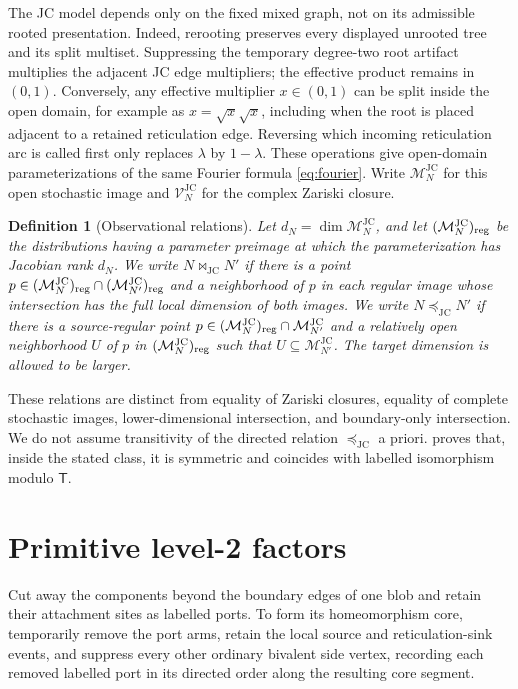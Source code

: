 \documentclass[11pt]{article}
\newtheorem{definition}[theorem]{Definition}
\theoremstyle{remark}
\newcommand{\M}{\mathcal M}
\newcommand{\V}{\mathcal V}
\newcommand{\JC}{\mathrm{JC}}
\newcommand{\Tmove}{\mathsf T}
\newcommand{\preceqjc}{\preceq_{\!\JC}}
\newcommand{\bowtiejc}{\mathbin{\bowtie}_{\!\JC}}
\begin{document}
The JC model depends only on the fixed mixed graph, not on its admissible
rooted presentation.  Indeed, rerooting preserves every displayed unrooted
tree and its split multiset.  Suppressing the temporary degree-two root
artifact multiplies the adjacent JC edge multipliers; the effective product
remains in $(0,1)$.  Conversely, any effective multiplier $x\in(0,1)$ can be
split inside the open domain, for example as $x=\sqrt{x}\sqrt{x}$, including
when the root is placed adjacent to a retained reticulation edge.  Reversing
which incoming reticulation arc is called first only replaces $\lambda$ by
$1-\lambda$.  These operations give open-domain parameterizations of the
same Fourier formula \eqref{eq:fourier}.  Write $\M_N^{\JC}$ for this open
stochastic image and $\V_N^{\JC}$ for the complex Zariski closure.

\begin{definition}[Observational relations]\label{def:relations}
Let $d_N=\dim\M_N^{\JC}$, and let $(\M_N^{\JC})_{\rm reg}$ be the
distributions having a parameter preimage at which the parameterization has
Jacobian rank $d_N$.  We write $N\bowtiejc N'$ if there is a point
$p\in(\M_N^{\JC})_{\rm reg}\cap(\M_{N'}^{\JC})_{\rm reg}$ and a neighborhood
of $p$ in each regular image whose intersection has the full local dimension
of both images.  We write $N\preceqjc N'$ if there is a source-regular point
$p\in(\M_N^{\JC})_{\rm reg}\cap\M_{N'}^{\JC}$ and a relatively open
neighborhood $U$ of $p$ in $(\M_N^{\JC})_{\rm reg}$ such that
$U\subseteq\M_{N'}^{\JC}$.  The target dimension is allowed to be larger.
\end{definition}

These relations are distinct from equality of Zariski closures, equality of
complete stochastic images, lower-dimensional intersection, and
boundary-only intersection.
We do not assume transitivity of the directed relation $\preceqjc$ a priori.
 proves that, inside the stated class, it is symmetric and
coincides with labelled isomorphism modulo $\Tmove$.

\section{Primitive level-2 factors}\label{sec:cores}

Cut away the components beyond the boundary edges of one blob and retain
their attachment sites as labelled ports.  To form its homeomorphism core,
temporarily remove the port arms, retain the local source and reticulation-sink
events, and suppress every other ordinary bivalent side vertex, recording
each removed labelled port in its directed order along the resulting core
segment.
\end{document}
